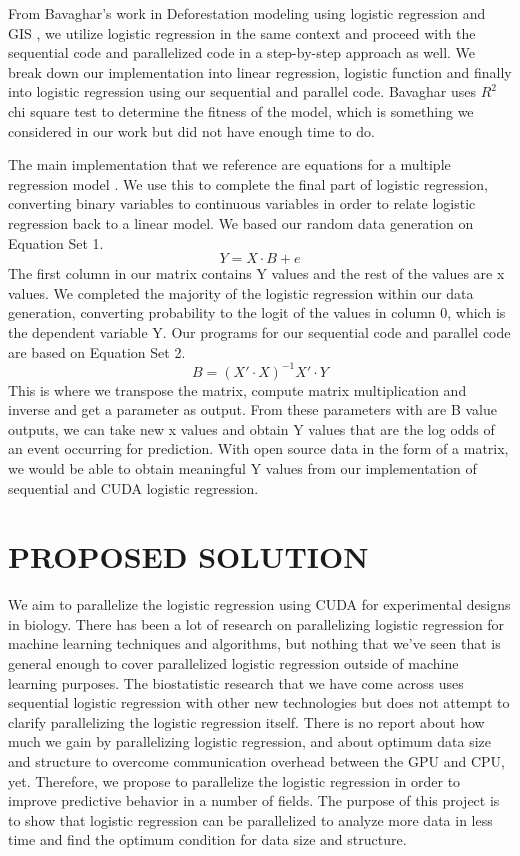 \documentclass[letterpaper, 10 pt, conference]{ieeeconf}  %
\begin{document}
From Bavaghar's work in Deforestation modeling using logistic regression and GIS \cite{c1}, we utilize logistic regression in the same context and proceed with the sequential code and parallelized code in a step-by-step approach as well. We break down our implementation into linear regression, logistic function and finally into logistic regression using our sequential and parallel code. Bavaghar uses $R^2$ chi square test to determine the fitness of the model, which is something we considered in our work but did not have enough time to do.

The main implementation that we reference are equations for a multiple regression model \cite{c9}. We use this to complete the final part of logistic regression, converting binary variables to continuous variables in order to relate logistic regression back to a linear model. We based our random data generation on Equation Set 1. 
$$Y = X \cdot B + e$$
The first column in our matrix contains Y values and the rest of the values are x values. We completed the majority of the logistic regression within our data generation, converting probability to the logit of the values in column 0, which is the dependent variable Y. Our programs for our sequential code and parallel code are based on Equation Set 2.
$$B = (X' \cdot X)^{-1} X' \cdot Y$$
This is where we transpose the matrix, compute matrix multiplication and inverse and get a parameter as output. From these parameters with are B value outputs, we can take new x values and obtain Y values that are the log odds of an event occurring for prediction. With open source data in the form of a matrix, we would be able to obtain meaningful Y values from our implementation of sequential and CUDA logistic regression.





\section{PROPOSED SOLUTION}
We aim to parallelize the logistic regression using CUDA for experimental designs in biology. There has been a lot of research on parallelizing logistic regression for machine learning techniques and algorithms, but nothing that we’ve seen that is general enough to cover parallelized logistic regression outside of machine learning purposes. The biostatistic research that we have come across uses sequential logistic regression with other new technologies but does not attempt to clarify parallelizing the logistic regression itself. There is no report about how much we gain by parallelizing logistic regression, and about optimum data size and structure to overcome communication overhead between the GPU and CPU, yet. Therefore, we propose to parallelize the logistic regression in order to improve predictive behavior in a number of fields. The purpose of this project is to show that logistic regression can be parallelized to analyze more data in less time and find the optimum condition for data size and structure.
\end{document}
